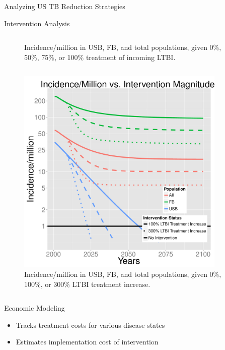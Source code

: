 \documentclass[final]{beamer}
\begin{document}
\begin{frame}
\begin{columns}
\begin{column}{.3\textwidth}
\begin{block}{Analyzing US TB Reduction Strategies}
\begin{block}{Intervention Analysis}
\begin{column}{.45\textwidth}
\begin{figure}[h]
\begin{center}
              \end{center}
              \caption{Incidence/million in USB, FB, and total populations,
                       given 0\%, 50\%, 75\%, or 100\% treatment of incoming
                       LTBI.}
              \label{fig:redEnLTBI_incidence}
            \end{figure}
          \end{column}
          \begin{column}{.45\textwidth}
            \begin{figure}[h]
              \begin{center}
                \includegraphics[height=10cm,width=\textwidth]{incLTBItrmtIncGrouped}
              \end{center}
              \caption{Incidence/million in USB, FB, and total populations,
                       given 0\%, 100\%, or 300\% LTBI treatment increase.}
              \label{fig:incLTBItrmt_incidence}
            \end{figure}
          \end{column}
        \end{block}
      \end{block}
      \begin{block}{Economic Modeling}
        \begin{itemize}
          \item Tracks treatment costs for various disease states
          \item Estimates implementation cost of intervention
        \end{itemize}
        \begin{block}{}

\end{block}
\end{block}
\end{column}
\end{columns}
\end{frame}
\end{document}
